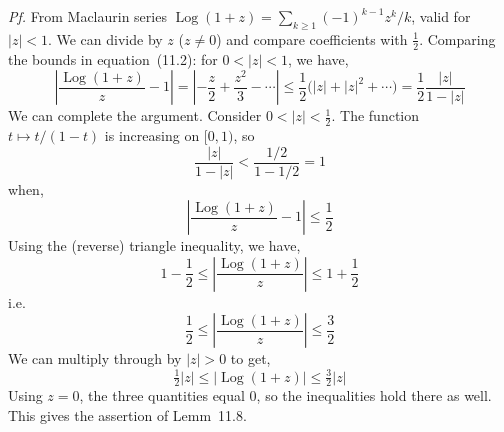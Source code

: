 \documentclass[a4paper]{article}
\DeclareMathOperator{\Log}{Log}
\begin{document}
\textit{Pf.} From Maclaurin series $\Log(1+z)=\sum_{k\ge 1}(-1)^{k-1}z^k/k$, valid for $|z|<1$. We can divide by $z$ ($z\ne 0$) and compare coefficients with $\tfrac12$.
Comparing the bounds in equation~(11.2): for $0<|z|<1$, we have,
\[
\left|\frac{\Log(1+z)}{z}-1\right|
=\left|-\frac{z}{2}+\frac{z^2}{3}-\cdots\right|
\le\frac12\bigl(|z|+|z|^2+\cdots\bigr)=\frac12\frac{|z|}{1-|z|}
\]
We can complete the argument. Consider $0<|z|<\tfrac12$. The function
$t\mapsto t/(1-t)$ is increasing on $[0,1)$, so
\[
\frac{|z|}{1-|z|}<\frac{1/2}{1-1/2}=1
\]
when,
\[
\left|\frac{\Log(1+z)}{z}-1\right|\le\frac12
\]
Using the (reverse) triangle inequality, we have,
\[
1-\frac12\le\left|\frac{\Log(1+z)}{z}\right|\le 1+\frac12
\]
i.e.
\[
\frac12\le\left|\frac{\Log(1+z)}{z}\right|\le\frac32
\]
We can multiply through by $|z|>0$ to get,
\[
\tfrac12|z|\le|\Log(1+z)|\le\tfrac32|z|
\]
Using $z=0$, the three quantities equal $0$, so the inequalities hold there as well. This gives the assertion of Lemm~11.8.
\end{document}
